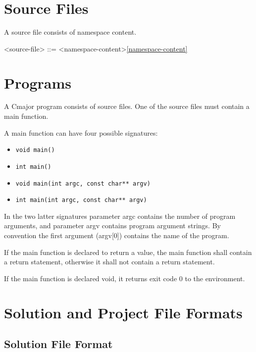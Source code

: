 \documentclass[a4paper,oneside,11pt]{article}
\begin{document}
\section{Source Files}

A source file consists of namespace content.

\begin{grammar}
<source-file> ::= <namespace-content>\ref{namespace-content}
\end{grammar}

\section{Programs}

A Cmajor program consists of source files.
One of the source files must contain a main function.

A main function can have four possible signatures:

\begin{itemize}
\item \texttt{void main()}
\item \texttt{int main()}
\item \texttt{void main(int argc, const char** argv)}
\item \texttt{int main(int argc, const char** argv)}
\end{itemize}

In the two latter signatures parameter argc contains the number of program arguments,
and parameter argv contains program argument strings.
By convention the first argument (argv[0]) contains the name of the program.

If the main function is declared to return a value, the main function shall contain
a return statement, otherwise it shall not contain a return statement.

If the main function is declared void, it returns exit code 0 to the environment.

\section{Solution and Project File Formats}

\subsection{Solution File Format}
\end{document}
